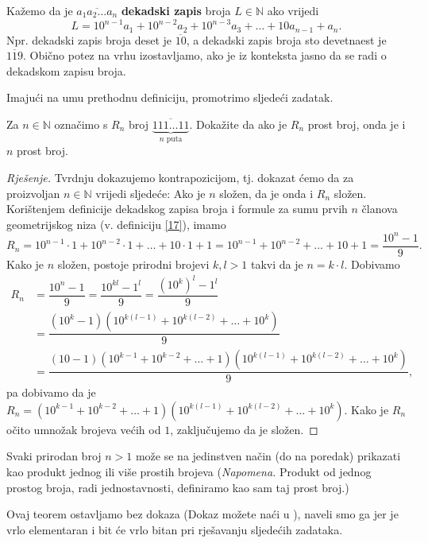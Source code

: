 \begin{definition}
Kažemo da je $\overline{a_1a_2\dots a_n}$ \textbf{dekadski zapis} broja $L\in \mathbb{N}$ ako vrijedi
$$L=10^{n-1}a_1+10^{n-2}a_2+10^{n-3}a_3+\dots+10a_{n-1}+a_n.$$
Npr. dekadski zapis broja deset je $\overline{10}$, a dekadski zapis broja sto devetnaest je $\overline{119}$. Obično potez na vrhu izostavljamo, ako je iz konteksta jasno da se radi o dekadskom zapisu broja.
\end{definition}

\noindent Imajući na umu prethodnu definiciju, promotrimo sljedeći zadatak.
\begin{exercise}
Za $n\in \mathbb{N}$ označimo s $R_n$ broj $\underbrace{\overline{111\dots 11}}_\text{$n$ puta}$. Dokažite da ako je $R_n$ prost broj, onda je i $n$ prost broj.
\end{exercise}
\begin{proof}[Rješenje]
Tvrdnju dokazujemo kontrapozicijom, tj. dokazat ćemo da za proizvoljan $n\in \mathbb{N}$ vrijedi sljedeće: Ako je $n$ složen, da je onda i $R_n$ složen. Korištenjem definicije dekadskog zapisa broja i formule za sumu prvih $n$ članova geometrijskog niza (v. definiciju \ref{17}), imamo
$$R_n=10^{n-1}\cdot 1+10^{n-2}\cdot 1+\dots+10\cdot 1+1=10^{n-1}+10^{n-2}+\dots+10+1=\dfrac{10^n-1}{9}.$$
Kako je $n$ složen, postoje prirodni brojevi $k, l>1$ takvi da je $n=k\cdot l$. Dobivamo
\begin{align*}
R_n&=\dfrac{10^n-1}{9}=\dfrac{10^{kl}-1^l}{9}=\dfrac{\left(10^{k}\right)^l-1^l}{9}\\
&=\dfrac{(10^k-1)(10^{k(l-1)}+10^{k(l-2)}+\dots+10^k)}{9}\\
&=\dfrac{(10-1)(10^{k-1}+10^{k-2}+\dots+1)(10^{k(l-1)}+10^{k(l-2)}+\dots+10^k)}{9},
\end{align*}
pa dobivamo da je $R_n=(10^{k-1}+10^{k-2}+\dots+1)(10^{k(l-1)}+10^{k(l-2)}+\dots+10^k)$. Kako je $R_n$ očito umnožak brojeva većih od $1$, zaključujemo da je složen.
\end{proof}
\begin{remark}
Svaki prirodan broj $n>1$ može se na jedinstven način (do na poredak) prikazati kao produkt jednog ili više prostih brojeva (\textit{Napomena.} Produkt od jednog prostog broja, radi jednostavnosti, definiramo kao sam taj prost broj.)
\end{remark}
Ovaj teorem ostavljamo bez dokaza (Dokaz možete naći u \cite{4}), naveli smo ga jer je vrlo elementaran i bit će vrlo bitan pri rješavanju sljedećih zadataka.
